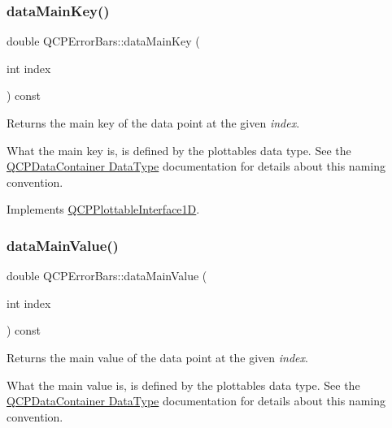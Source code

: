 \mbox{\label{classQCPErrorBars_a7cba420078adc523efa59fb8c6ca23e0}} 
\subsubsection{\texorpdfstring{data\+Main\+Key()}{dataMainKey()}}
{\footnotesize\ttfamily double Q\+C\+P\+Error\+Bars\+::data\+Main\+Key (\begin{DoxyParamCaption}\item[{int}]{index }\end{DoxyParamCaption}) const\hspace{0.3cm}{\ttfamily [virtual]}}

Returns the main key of the data point at the given {\itshape index}.

What the main key is, is defined by the plottable\textquotesingle{}s data type. See the \hyperlink{classQCPDataContainer_qcpdatacontainer-datatype}{Q\+C\+P\+Data\+Container Data\+Type} documentation for details about this naming convention. 

Implements \hyperlink{classQCPPlottableInterface1D_a2bd60daaac046945fead558cbd83cf73}{Q\+C\+P\+Plottable\+Interface1D}.

\mbox{\label{classQCPErrorBars_ae9f6c79c03147efb1a67742c55386dc8}} 
\subsubsection{\texorpdfstring{data\+Main\+Value()}{dataMainValue()}}
{\footnotesize\ttfamily double Q\+C\+P\+Error\+Bars\+::data\+Main\+Value (\begin{DoxyParamCaption}\item[{int}]{index }\end{DoxyParamCaption}) const\hspace{0.3cm}{\ttfamily [virtual]}}

Returns the main value of the data point at the given {\itshape index}.

What the main value is, is defined by the plottable\textquotesingle{}s data type. See the \hyperlink{classQCPDataContainer_qcpdatacontainer-datatype}{Q\+C\+P\+Data\+Container Data\+Type} documentation for details about this naming convention. 

